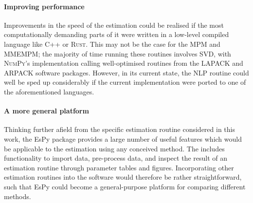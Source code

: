 \paragraph{Improving performance}
Improvements in the speed of the estimation
could be realised if the most computationally demanding parts of it were
written in a low-level compiled language like C++ or \textsc{Rust}. This may not
be the case for the \ac{MPM} and \ac{MMEMPM}; the majority of time running
these routines involves \ac{SVD}, with \textsc{NumPy}'s implementation calling
well-optimised routines from the \textsc{LAPACK} and \textsc{ARPACK} software
packages. However, in its current state, the \ac{NLP} routine could well be
sped up considerably if the current \Python implementation were ported to one
of the aforementioned languages.

\paragraph{A more general platform}
Thinking further afield from the specific estimation routine considered in this
work, the \ac{EsPy} package provides a large number of useful features which
would be applicable to the estimation using any conceived method. The includes
functionality to import data, pre-process data, and inspect the result of an
estimation routine through parameter tables and figures.
Incorporating other estimation routines into the software would therefore be
rather straightforward, such that \ac{EsPy} could become a general-purpose
platform for comparing different methods.

